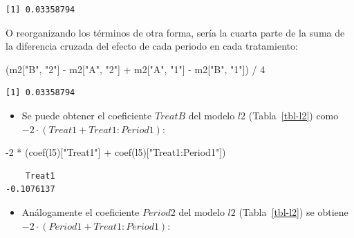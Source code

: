 \documentclass[
  12pt,
  a4paper,
  extrafontsizes,
  onecolumn,
  openright,
  table]{memoir}
\newenvironment{Shaded}{\begin{snugshade}}{\end{snugshade}}
\newcommand{\DecValTok}[1]{\textcolor[rgb]{0.68,0.00,0.00}{#1}}
\newcommand{\FunctionTok}[1]{\textcolor[rgb]{0.28,0.35,0.67}{#1}}
\newcommand{\NormalTok}[1]{\textcolor[rgb]{0.00,0.23,0.31}{#1}}
\newcommand{\SpecialCharTok}[1]{\textcolor[rgb]{0.37,0.37,0.37}{#1}}
\newcommand{\StringTok}[1]{\textcolor[rgb]{0.13,0.47,0.30}{#1}}
\providecommand{\tightlist}{%
  \setlength{\itemsep}{0pt}\setlength{\parskip}{0pt}}\usepackage{longtable,booktabs,array}
\begin{document}
\begin{verbatim}
[1] 0.03358794
\end{verbatim}

\normalsize

O reorganizando los términos de otra forma, sería la cuarta parte de la
suma de la diferencia cruzada del efecto de cada periodo en cada
tratamiento:

\scriptsize

\begin{Shaded}
\begin{Highlighting}[]
\NormalTok{(m2[}\StringTok{"B"}\NormalTok{, }\StringTok{"2"}\NormalTok{] }\SpecialCharTok{{-}}\NormalTok{ m2[}\StringTok{"A"}\NormalTok{, }\StringTok{"2"}\NormalTok{] }\SpecialCharTok{+}\NormalTok{ m2[}\StringTok{"A"}\NormalTok{, }\StringTok{"1"}\NormalTok{] }\SpecialCharTok{{-}}\NormalTok{ m2[}\StringTok{"B"}\NormalTok{, }\StringTok{"1"}\NormalTok{]) }\SpecialCharTok{/} \DecValTok{4}
\end{Highlighting}
\end{Shaded}

\begin{verbatim}
[1] 0.03358794
\end{verbatim}

\normalsize

\begin{itemize}
\tightlist
\item
  Se puede obtener el coeficiente \(TreatB\) del modelo \(l2\)
  (Tabla~\ref{tbl-l2}) como \(-2 \cdot (Treat1 + Treat1:Period1)\):
\end{itemize}

\scriptsize

\begin{Shaded}
\begin{Highlighting}[]
\SpecialCharTok{{-}}\DecValTok{2} \SpecialCharTok{*}\NormalTok{ (}\FunctionTok{coef}\NormalTok{(l5)[}\StringTok{"Treat1"}\NormalTok{] }\SpecialCharTok{+} \FunctionTok{coef}\NormalTok{(l5)[}\StringTok{"Treat1:Period1"}\NormalTok{])}
\end{Highlighting}
\end{Shaded}

\begin{verbatim}
    Treat1 
-0.1076137 
\end{verbatim}

\normalsize

\begin{itemize}
\tightlist
\item
  Análogamente el coeficiente \(Period2\) del modelo \(l2\)
  (Tabla~\ref{tbl-l2}) se obtiene
  \(-2 \cdot (Period1 + Treat1:Period1)\):
\end{itemize}
\end{document}
